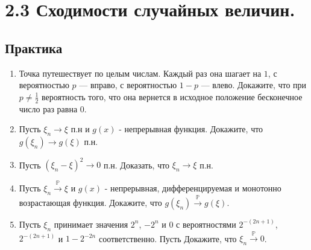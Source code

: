 \documentclass[a4paper, 14pt]{extarticle}
\begin{document}
	  
\newpage
\section*{2.3 Сходимости случайных величин.}
\subsection*{Практика}
\begin{enumerate}

\item Точка путешествует по целым числам. Каждый раз она шагает на $1$, с вероятностью $p$ — вправо, с вероятностью $1-p$ — влево. 
Докажите, что при $p \neq \frac{1}{2}$ вероятность того, что она вернется в исходное положение бесконечное число раз равна $0$.

\item Пусть $\xi_n \to \xi$ п.н и $g(x)$ - непрерывная функция. Докажите, что $g(\xi_n) \to g(\xi)$ п.н.

\item Пусть $(\xi_n - \xi)^2 \to 0$ п.н. Доказать, что $\xi_n \to \xi$ п.н.

\item Пусть $\xi_n \overset{\mathbb{P}}{\to} \xi$ и $g(x)$ - непрерывная, дифференцируемая и монотонно возрастающая функция. Докажите, что $g(\xi_n) \overset{\mathbb{P}}{\to} g(\xi)$.

\item Пусть $\xi_n$ принимает значения $2^n$, $- 2^n$ и $0$ с вероятностями $2^{-(2n+1)}$, $2^{-(2n+1)}$ и $1 - 2^{-2n}$ соответственно. 
Пусть Докажите, что $\xi_n \overset{\mathbb{P}}{\to} 0$.


\end{enumerate}
\newpage
\end{document}
